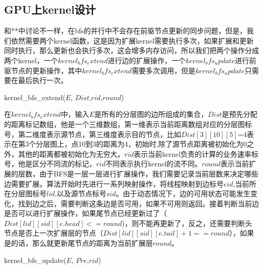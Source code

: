 \subsection{GPU上kernel设计}
  和**中讨论不一样，在bfs的并行中不会存在前驱节点更新的同步问题，但是，我们依然需要两个kernel函数，这是因为扩展kernel需要执行多次，如果扩展和更新同时执行，那么更新也会执行多次，这会增多内存访问，所以我们把两个操作分成两个kernel，一个$kernel_bfs_extend$进行边的扩展操作，一个$kernel_bfs_update$进行前驱节点的更新操作，其中$kernel_bfs_extend$需要多次调用，但是$kernel_bfs_update$只需要在最后执行一次。
\begin{algorithm}[t]
\begin{algorithmic}[1]
\caption{\small{kernel\_bfs\_extend($E$, $Dist$,$rid$,$round$)}}
\label{KernelBFS}
\EndIf
{}
\EndIf
\Return
\end{algorithmic}
\end{algorithm} 
 在$kernel_bfs_extend$中，输入$E$是所有的分层图的边所组成的集合，$Dist$是预先分配的距离标记数组，他是一个三维数组，第一维表示当前距离数组对应的分层图标号，第二维度表示源节点，第三维度表示目的节点，比如$Dist[3][10][5]$=4表示在第3个分层图上，点10到3的距离为4，初始时,除了源节点距离被初始化为0之外，其他的距离都被初始化为无穷大。$rid$表示当前kernel负责的计算的业务速率标号，他是区分不同流的标记，$rid$不同表示执行kernel的流不同。$round$表示当前扩展的层数，由于BFS是一层一层进行扩展操作，我们需要记录当前层数来决定哪些边需要扩展。算法开始时先进行一系列映射操作，将线程映射到边标号$eid$,当前所在分层图标号$lid$,以及源节点标号$sid$。由于动态情况下，边的可用状态可能发生变化，找到边之后，需要判断这条边是否可用，如果不可用则返回。接着判断当前边是否可以进行扩展操作，如果尾节点已经更新过了（$Dist[lid][sid][e.head]<=round$)，则不能再更新了，反之，还需要判断头节点是否上一次扩展层的节点（$Dist[lid][sid][e.tail]+1==round$），如果是的话，那么就更新尾节点的距离为当前扩展层$round$。
\begin{algorithm}[t]
\begin{algorithmic}[1]
\caption{\small{kernel\_bfs\_update($E$, $Pre$,$rid$)}}
\label{KernelBFS}
\EndIf
{}
\EndIf
\Return
\end{algorithmic}
\end{algorithm} 
